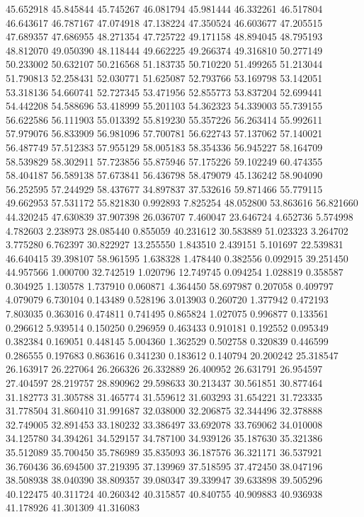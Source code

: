 45.652918
45.845844
45.745267
46.081794
45.981444
46.332261
46.517804
46.643617
46.787167
47.074918
47.138224
47.350524
46.603677
47.205515
47.689357
47.686955
48.271354
47.725722
49.171158
48.894045
48.795193
48.812070
49.050390
48.118444
49.662225
49.266374
49.316810
50.277149
50.233002
50.632107
50.216568
51.183735
50.710220
51.499265
51.213044
51.790813
52.258431
52.030771
51.625087
52.793766
53.169798
53.142051
53.318136
54.660741
52.727345
53.471956
52.855773
53.837204
52.699441
54.442208
54.588696
53.418999
55.201103
54.362323
54.339003
55.739155
56.622586
56.111903
55.013392
55.819230
55.357226
56.263414
55.992611
57.979076
56.833909
56.981096
57.700781
56.622743
57.137062
57.140021
56.487749
57.512383
57.955129
58.005183
58.354336
56.945227
58.164709
58.539829
58.302911
57.723856
55.875946
57.175226
59.102249
60.474355
58.404187
56.589138
57.673841
56.436798
58.479079
45.136242
58.904090
56.252595
57.244929
58.437677
34.897837
37.532616
59.871466
55.779115
49.662953
57.531172
55.821830
0.992893
7.825254
48.052800
53.863616
56.821660
44.320245
47.630839
37.907398
26.036707
7.460047
23.646724
4.652736
5.574998
4.782603
2.238973
28.085440
0.855059
40.231612
30.583889
51.023323
3.264702
3.775280
6.762397
30.822927
13.255550
1.843510
2.439151
5.101697
22.539831
46.640415
39.398107
58.961595
1.638328
1.478440
0.382556
0.092915
39.251450
44.957566
1.000700
32.742519
1.020796
12.749745
0.094254
1.028819
0.358587
0.304925
1.130578
1.737910
0.060871
4.364450
58.697987
0.207058
0.409797
4.079079
6.730104
0.143489
0.528196
3.013903
0.260720
1.377942
0.472193
7.803035
0.363016
0.474811
0.741495
0.865824
1.027075
0.996877
0.133561
0.296612
5.939514
0.150250
0.296959
0.463433
0.910181
0.192552
0.095349
0.382384
0.169051
0.448145
5.004360
1.362529
0.502758
0.320839
0.446599
0.286555
0.197683
0.863616
0.341230
0.183612
0.140794
20.200242
25.318547
26.163917
26.227064
26.266326
26.332889
26.400952
26.631791
26.954597
27.404597
28.219757
28.890962
29.598633
30.213437
30.561851
30.877464
31.182773
31.305788
31.465774
31.559612
31.603293
31.654221
31.723335
31.778504
31.860410
31.991687
32.038000
32.206875
32.344496
32.378888
32.749005
32.891453
33.180232
33.386497
33.692078
33.769062
34.010008
34.125780
34.394261
34.529157
34.787100
34.939126
35.187630
35.321386
35.512089
35.700450
35.786989
35.835093
36.187576
36.321171
36.537921
36.760436
36.694500
37.219395
37.139969
37.518595
37.472450
38.047196
38.508938
38.040390
38.809357
39.080347
39.339947
39.633898
39.505296
40.122475
40.311724
40.260342
40.315857
40.840755
40.909883
40.936938
41.178926
41.301309
41.316083
